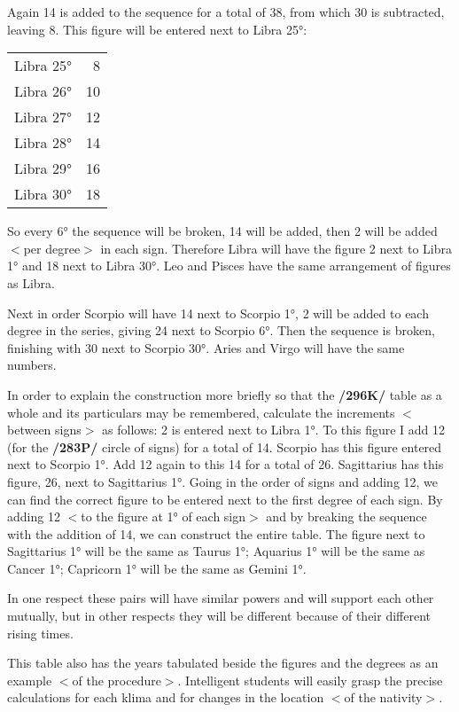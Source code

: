 Again 14 is added to the sequence for a total of 38, from which 30 is subtracted, leaving 8. This figure will be entered next to Libra 25°:

\begin{tabular}{lr}
Libra 25° & 8 \\
Libra 26° & 10 \\ 
Libra 27° & 12 \\
Libra 28° & 14 \\ 
Libra 29° & 16 \\ 
Libra 30° & 18 \\
\end{tabular}

So every 6° the sequence will be broken, 14 will be added, then 2 will be added $<$per degree$>$ in each sign. Therefore Libra will have the figure 2 next to Libra 1° and 18 next to Libra 30°. Leo and Pisces have the same arrangement of figures as Libra.

Next in order Scorpio will have 14 next to Scorpio 1°, 2 will be added to each degree in the series, giving 24 next to Scorpio 6°. Then the sequence is broken, finishing with 30 next to Scorpio 30°. Aries and Virgo will have the same numbers.

In order to explain the construction more briefly so that the \textbf{/296K/} table as a whole and its particulars may be remembered, calculate the increments $<$between signs$>$ as follows: 2 is entered next to Libra 1°. To this figure I add 12 (for the \textbf{/283P/} circle of signs) for a total of 14. Scorpio has this figure entered next to Scorpio 1°. Add 12 again to this 14 for a total of 26. Sagittarius has this figure, 26, next to Sagittarius 1°. Going in the order of signs and adding 12, we can find the correct figure to be entered next to the first degree of each sign. By adding 12 $<$to the figure at 1° of each sign$>$ and by breaking the sequence with the addition of 14, we can construct the entire table. The figure next to Sagittarius 1° will be the same as
Taurus 1°; Aquarius 1° will be the same as Cancer 1°; Capricorn 1° will be the same as Gemini 1°. 

In one respect these pairs will have similar powers and will support each other mutually, but in other respects they will be different because of their different rising times. 

This table also has the years tabulated beside the figures and the degrees as an example $<$of the procedure$>$. Intelligent students will easily grasp the precise calculations for each klima and for changes in the location $<$of the nativity$>$.

\newpage